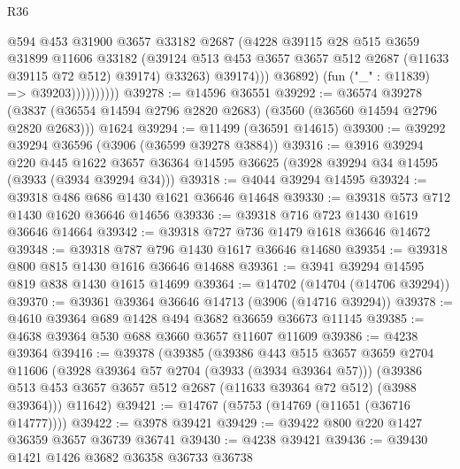 \begin{lexlean}{R36}
\begin{coremodule}
                              @594
                              @453
                              @31900
                              @3657
                              @33182
                              @2687
                              (@4228
                                @39115
                                @28
                                @515
                                @3659
                                @31899
                                @11606
                                @33182
                                (@39124
                                  @513
                                  @453
                                  @3657
                                  @3657
                                  @512
                                  @2687
                                  (@11633 @39115 @72 @512)
                                  @39174)
                                @33263)
                              @39174)))
                        @36892)
                      (fun ("_" : @11839) => @39203))))))))))
@39278 := @14596 @36551
@39292 := @36574
    @39278
    (@3837 (@36554 @14594 @2796 @2820 @2683) (@3560 (@36560 @14594 @2796 @2820 @2683)))
    @1624
@39294 := @11499 (@36591 @14615)
@39300 := @39292 @39294 @36596 (@3906 (@36599 @39278 @3884))
@39316 := @3916
    @39294
    @220
    @445
    @1622
    @3657
    @36364
    @14595
    @36625
    (@3928 @39294 @34 @14595 (@3933 (@3934 @39294 @34)))
@39318 := @4044 @39294 @14595
@39324 := @39318 @486 @686 @1430 @1621 @36646 @14648
@39330 := @39318 @573 @712 @1430 @1620 @36646 @14656
@39336 := @39318 @716 @723 @1430 @1619 @36646 @14664
@39342 := @39318 @727 @736 @1479 @1618 @36646 @14672
@39348 := @39318 @787 @796 @1430 @1617 @36646 @14680
@39354 := @39318 @800 @815 @1430 @1616 @36646 @14688
@39361 := @3941 @39294 @14595 @819 @838 @1430 @1615 @14699
@39364 := @14702 (@14704 (@14706 @39294))
@39370 := @39361 @39364 @36646 @14713 (@3906 (@14716 @39294))
@39378 := @4610 @39364 @689 @1428 @494 @3682 @36659 @36673 @11145
@39385 := @4638 @39364 @530 @688 @3660 @3657 @11607 @11609
@39386 := @4238 @39364
@39416 := @39378
    (@39385
      (@39386
        @443
        @515
        @3657
        @3659
        @2704
        @11606
        (@3928 @39364 @57 @2704 (@3933 (@3934 @39364 @57)))
        (@39386 @513 @453 @3657 @3657 @512 @2687 (@11633 @39364 @72 @512) (@3988 @39364)))
      @11642)
@39421 := @14767 (@5753 (@14769 (@11651 (@36716 @14777))))
@39422 := @3978 @39421
@39429 := @39422 @800 @220 @1427 @36359 @3657 @36739 @36741
@39430 := @4238 @39421
@39436 := @39430 @1421 @1426 @3682 @36358 @36733 @36738

\end{coremodule}
\end{lexlean}

